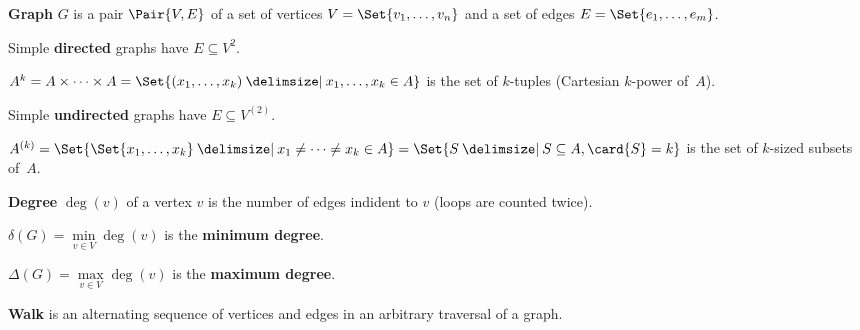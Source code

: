 \documentclass[a4paper,12pt]{article}
\newcommand{\op}[1]{\operatorname*{#1}}
\newcommand{\degree}[1]{\op{deg}(#1)}
\newcommand{\minDegree}[1]{\delta(#1)}
\newcommand{\maxDegree}[1]{\Delta(#1)}
\begin{document}
\begin{terms}
    \item \textbf{Graph} $G$ is a pair $\Pair{V, E}$ of a set of vertices $V = \Set{v_1,\dotsc,v_n}$ and a set of edges $E = \Set{e_1,\dotsc,e_m}$.

    \item Simple \textbf{directed} graphs have $E \subseteq V^{2}$.

    \begin{terms}
        \item $A^k = A \times \dots \times A = \Set{(x_1,\dotsc,x_k) \given x_1,\dotsc,x_k \in A}$ is the set of $k$-tuples (Cartesian $k$-power of~$A$).
    \end{terms}

    \item Simple \textbf{undirected} graphs have $E \subseteq V^{(2)}$.

    \begin{terms}
        \item $A^{(k)} = \Set{\Set{x_1,\dotsc,x_k} \given x_1 \neq \dotsb \neq x_k \in A} = \Set{ S \given S \subseteq A, \card{S} = k }$ is the set of $k$-sized subsets of~$A$.
    \end{terms}

    \item \textbf{Degree} $\degree{v}$ of a vertex $v$ is the number of edges indident to $v$ (loops are counted twice).

    \begin{terms}
        \item $\minDegree{G} = \min\limits_{v \in V} \degree{v}$ is the \textbf{minimum degree}.
        \item $\maxDegree{G} = \max\limits_{v \in V} \degree{v}$ is the \textbf{maximum degree}.
    \end{terms}


    \item \textbf{Walk} is an alternating sequence of vertices and edges in an arbitrary traversal of a graph.


\end{terms}
\end{document}
